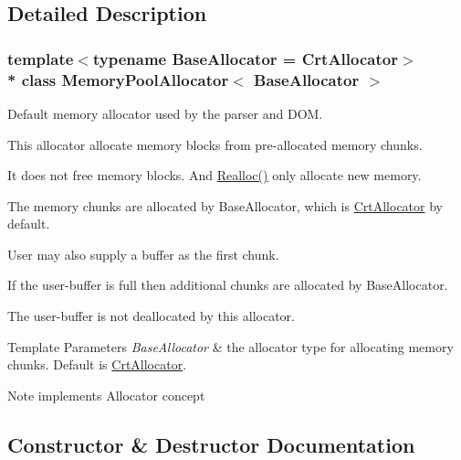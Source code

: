 \subsection{Detailed Description}
\subsubsection*{template$<$typename Base\+Allocator = Crt\+Allocator$>$\\*
class Memory\+Pool\+Allocator$<$ Base\+Allocator $>$}

Default memory allocator used by the parser and D\+OM. 

This allocator allocate memory blocks from pre-\/allocated memory chunks.

It does not free memory blocks. And \hyperlink{class_memory_pool_allocator_aba75280d42184b0ad414243f7f5ac6c7}{Realloc()} only allocate new memory.

The memory chunks are allocated by Base\+Allocator, which is \hyperlink{class_crt_allocator}{Crt\+Allocator} by default.

User may also supply a buffer as the first chunk.

If the user-\/buffer is full then additional chunks are allocated by Base\+Allocator.

The user-\/buffer is not deallocated by this allocator.


\begin{DoxyTemplParams}{Template Parameters}
{\em Base\+Allocator} & the allocator type for allocating memory chunks. Default is \hyperlink{class_crt_allocator}{Crt\+Allocator}. \\
\hline
\end{DoxyTemplParams}
\begin{DoxyNote}{Note}
implements Allocator concept 
\end{DoxyNote}


\subsection{Constructor \& Destructor Documentation}
